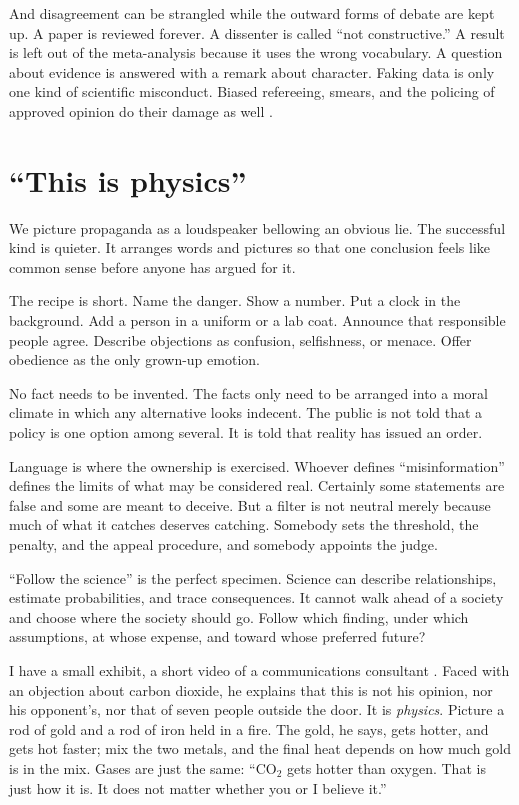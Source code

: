 \documentclass[12pt,a4paper]{book}
\begin{document}
And disagreement can be strangled while the outward forms of debate are kept up. A paper is reviewed forever. A dissenter is called ``not constructive.'' A result is left out of the meta-analysis because it uses the wrong vocabulary. A question about evidence is answered with a remark about character. Faking data is only one kind of scientific misconduct. Biased refereeing, smears, and the policing of approved opinion do their damage as well \cite{Cabbolet-2013}.

\section{``This is physics''}

We picture propaganda as a loudspeaker bellowing an obvious lie. The successful kind is quieter. It arranges words and pictures so that one conclusion feels like common sense before anyone has argued for it.

The recipe is short. Name the danger. Show a number. Put a clock in the background. Add a person in a uniform or a lab coat. Announce that responsible people agree. Describe objections as confusion, selfishness, or menace. Offer obedience as the only grown-up emotion.

No fact needs to be invented. The facts only need to be arranged into a moral climate in which any alternative looks indecent. The public is not told that a policy is one option among several. It is told that reality has issued an order.

Language is where the ownership is exercised. Whoever defines ``misinformation'' defines the limits of what may be considered real. Certainly some statements are false and some are meant to deceive. But a filter is not neutral merely because much of what it catches deserves catching. Somebody sets the threshold, the penalty, and the appeal procedure, and somebody appoints the judge.

``Follow the science'' is the perfect specimen. Science can describe relationships, estimate probabilities, and trace consequences. It cannot walk ahead of a society and choose where the society should go. Follow which finding, under which assumptions, at whose expense, and toward whose preferred future?

I have a small exhibit, a short video of a communications consultant \cite{CommunicationsConsultantCO2Video}. Faced with an objection about carbon dioxide, he explains that this is not his opinion, nor his opponent's, nor that of seven people outside the door. It is \emph{physics}. Picture a rod of gold and a rod of iron held in a fire. The gold, he says, gets hotter, and gets hot faster; mix the two metals, and the final heat depends on how much gold is in the mix. Gases are just the same: ``CO$_2$ gets hotter than oxygen. That is just how it is. It does not matter whether you or I believe it.''
\end{document}
